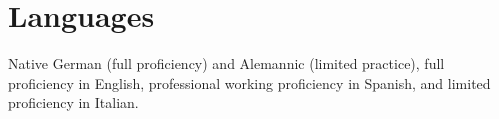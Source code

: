 \section{Languages}

Native German (full proficiency) and Alemannic (limited practice), 
full proficiency in English, 
professional working proficiency in Spanish, 
and limited proficiency in Italian.


